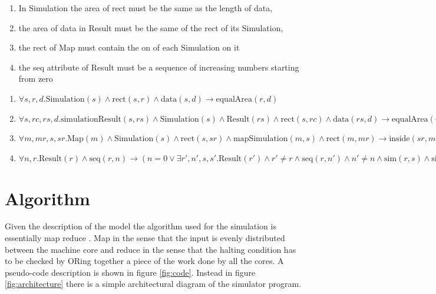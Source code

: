 \documentclass[Lau]{sapthesis} %
\let\oldsection\section
\def\subsection{\oldsection}
\def\section{\chapter}
\begin{document}
\begin{enumerate}
\item In Simulation the area of rect must be the same as the length of data,
\item the area of data in Result must be the same of the rect of its Simulation,
\item the rect of Map must contain the on of each Simulation on it
\item the seq attribute of Result must be a sequence of increasing numbers
starting from zero
\end{enumerate}

\begin{enumerate}
\item $\forall s,r,d.\textrm{Simulation}(s)
	\land \textrm{rect}(s,r)
	\land \textrm{data}(s,d)
	\rightarrow \textrm{equalArea}(r,d)$
\item $\forall s,rc,rs,d.\textrm{simulationResult}(s,rs) \allowbreak
	\land \textrm{Simulation}(s) \allowbreak
	\land \textrm{Result}(rs) \allowbreak
	\land \textrm{rect}(s,rc) \allowbreak
	\land \textrm{data}(rs,d) \allowbreak
	\rightarrow\textrm{equalArea}(rc,d)$
\item $\forall m,mr,s,sr. \textrm{Map}(m)
	\land \textrm{Simulation}(s) \allowbreak
	\land \textrm{rect}(s,sr) \allowbreak
	\land \textrm{mapSimulation}(m,s) \allowbreak
	\land \textrm{rect}(m,mr) \allowbreak
	\rightarrow \textrm{inside}(sr,mr)$
\item $\forall n,r.\textrm{Result}(r)
	\land\textrm{seq}(r,n)
	\rightarrow
	(n=0 \lor \exists r',n',s,s'.\textrm{Result}(r')
		\land r'\neq r
		\land \textrm{seq}(r,n')
		\land n'\neq n
		\land \textrm{sim}(r,s)
		\land \textrm{sim}(r',s')
		\land s'=s\rightarrow n'=n-1)$
\end{enumerate}

\subsection{Algorithm}

Given the description of the model the algorithm used for the simulation is
essentially map reduce \cite{sac}. Map in the sense that the input is evenly
distributed between the machine core and reduce in the sense that the halting
condition has to be checked by ORing together a piece of the work done by all
the cores. A pseudo-code description is shown in figure \ref{fig:code}. Instead
in figure \ref{fig:architecture} there is a simple architectural diagram of the
simulator program.
\end{document}
